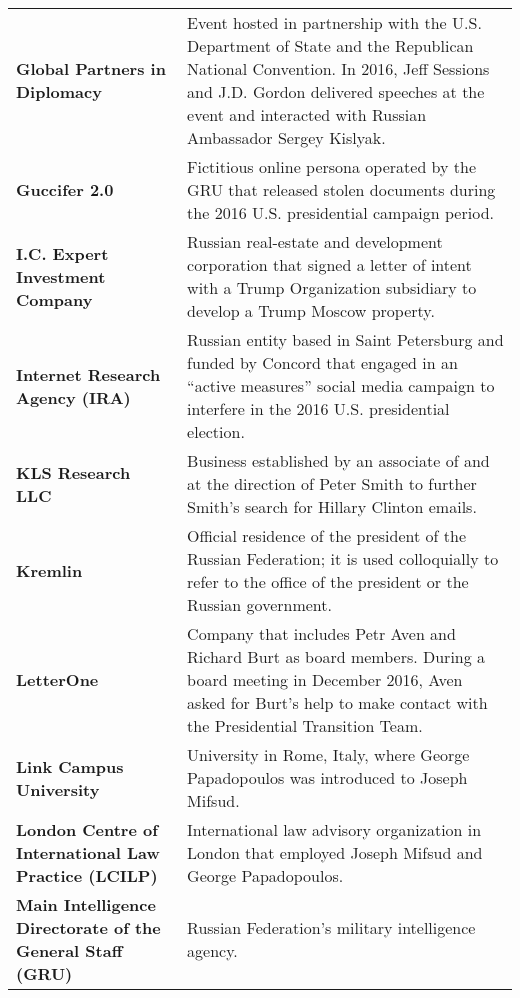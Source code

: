 \begin{longtable}{ p{} p{} }
    \textbf{Global Partners in Diplomacy} & Event hosted in partnership with the U.S. Department of State and the Republican National Convention. In 2016, Jeff Sessions and J.D. Gordon delivered speeches at the event and interacted with Russian Ambassador Sergey Kislyak. \\

    \textbf{Guccifer 2.0} & Fictitious online persona operated by the GRU that released stolen documents during the 2016 U.S. presidential campaign period. \\

    \textbf{I.C. Expert Investment Company} & Russian real-estate and development corporation that signed a letter of intent with a Trump Organization subsidiary to develop a Trump Moscow property. \\

    \textbf{Internet Research Agency (IRA)} & Russian entity based in Saint Petersburg and funded by Concord that engaged in an ``active measures'' social media campaign to interfere in the 2016 U.S. presidential election. \\

    \textbf{KLS Research LLC} & Business established by an associate of and at the direction of Peter Smith to further Smith's search for Hillary Clinton emails. \\

    \textbf{Kremlin} & Official residence of the president of the Russian Federation; it is used colloquially to refer to the office of the president or the Russian government. \\

    \textbf{LetterOne} & Company that includes Petr Aven and Richard Burt as board members. During a board meeting in December 2016, Aven asked for Burt's help to make contact with the Presidential Transition Team. \\

    \textbf{Link Campus University} & University in Rome, Italy, where George Papadopoulos was introduced to Joseph Mifsud. \\

    \textbf{London Centre of International Law Practice (LCILP)} & International law advisory organization in London that employed Joseph Mifsud and George Papadopoulos. \\

    \textbf{Main Intelligence Directorate of the General Staff (GRU)} & Russian Federation's military intelligence agency. \\


\end{longtable}
